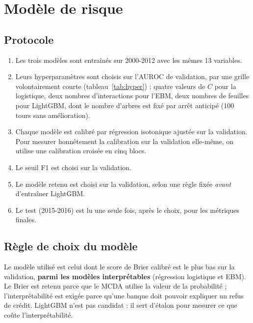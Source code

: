 \section{Modèle de risque}

\subsection{Protocole}

\begin{enumerate}
  \item Les trois modèles sont entraînés sur 2000-2012 avec les mêmes 13 variables.
  \item Leurs hyperparamètres sont choisis sur l'AUROC de validation, par une grille volontairement courte
        (tableau~\ref{tab:hyper}) : quatre valeurs de $C$ pour la logistique, deux nombres d'interactions pour l'EBM,
        deux nombres de feuilles pour LightGBM, dont le nombre d'arbres est fixé par arrêt anticipé (100 tours sans
        amélioration).
  \item Chaque modèle est calibré par régression isotonique ajustée sur la validation. Pour mesurer honnêtement la
        calibration sur la validation elle-même, on utilise une calibration croisée en cinq blocs.
  \item Le seuil F1 est choisi sur la validation.
  \item Le modèle retenu est choisi sur la validation, selon une règle fixée \emph{avant} d'entraîner LightGBM.
  \item Le test (2015-2016) est lu une seule fois, après le choix, pour les métriques finales.
\end{enumerate}



\subsection{Règle de choix du modèle}

\begin{encadre}
Le modèle utilisé est celui dont le score de Brier calibré est le plus bas sur la validation, \textbf{parmi les
modèles interprétables} (régression logistique et EBM). Le Brier est retenu parce que le MCDA utilise la valeur de la
probabilité ; l'interprétabilité est exigée parce qu'une banque doit pouvoir expliquer un refus de crédit.
LightGBM n'est pas candidat : il sert d'étalon pour mesurer ce que coûte l'interprétabilité.
\end{encadre}

